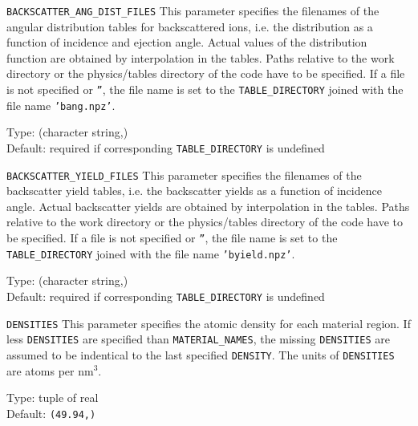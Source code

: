 \begin{keydescription}{\texttt{BACKSCATTER\_ANG\_DIST\_FILES}}
This parameter specifies the filenames of the angular distribution tables for
backscattered ions, i.e. the distribution as a function of incidence and
ejection angle. Actual values of the distribution function are obtained by
interpolation in the tables. Paths relative to the work
directory or the physics/tables directory of the code have to be specified. If a
file is not specified or \texttt{''}, the file name is set to the
\texttt{TABLE\_DIRECTORY} joined with the file name \texttt{'bang.npz'}.
\begin{keytab}
   Type:    \> (character string,) \\
   Default: \> required if corresponding \texttt{TABLE\_DIRECTORY} is
               undefined \\ 
\end{keytab}
\end{keydescription}

\begin{keydescription}{\texttt{BACKSCATTER\_YIELD\_FILES}}
This parameter specifies the filenames of the backscatter yield tables,
i.e. the backscatter yields as a function of incidence angle. Actual backscatter 
yields are obtained by interpolation in the tables. Paths relative to the work
directory or the physics/tables directory of the code have to be specified. If a
file is not specified or \texttt{''}, the file name is set to the
\texttt{TABLE\_DIRECTORY} joined with the file name \texttt{'byield.npz'}.
\begin{keytab}
   Type:    \> (character string,) \\
   Default: \> required if corresponding \texttt{TABLE\_DIRECTORY} is
               undefined
\end{keytab}
\end{keydescription}

\begin{keydescription}{\texttt{DENSITIES}}
This parameter specifies the atomic density for each material region. If less
\texttt{DENSITIES} are specified than \texttt{MATERIAL\_NAMES}, the missing
\texttt{DENSITIES} are assumed to be indentical to the last specified
\texttt{DENSITY}. The units of \texttt{DENSITIES} are atoms per nm$^3$.
\begin{keytab}
   Type:    \> tuple of real \\
   Default: \> \texttt{(49.94,)}
\end{keytab}
\end{keydescription}

